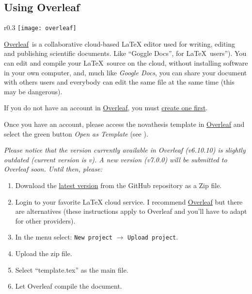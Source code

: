 \subsection{Using Overleaf}
\label{sub:using_overleaf}


\newcommand{\Overleaf}{\href{https://www.overleaf.com?r=f5160636&rm=d&rs=b}{Overleaf}}

\begin{wrapfigure}{r}{0.3\linewidth}
\texttt{[image: overleaf]}%
\caption{NOVAthesis template in Overleaf.}
\label{fig:overleaf}
\end{wrapfigure}
\mbox{}\Overleaf\ is a collaborative cloud-based LaTeX editor used for writing, editing and publishing scientific documents. Like “Goggle Docs”,  for \LaTeX\ users”). You can edit and compile your \LaTeX\ source on the cloud, without installing software in your own computer, and, much like \emph{Google Docs}, you can share your document with others users and everybody can edit the same file at the same time (this may be dangerous).

If you do not have an account in \Overleaf, you must \href{https://www.overleaf.com?r=f5160636&rm=d&rs=b}{create one first}.

Once you have an account, please access the \gls{novathesis} template in \href{https://www.overleaf.com/latex/templates/novathesis-v6-dot-10-dot-10/jhqwhtcwbmqc}{Overleaf} and select the green button \emph{Open as Template} (see ).

\bgroup
  \itshape
  Please notice that the version currently available in Overleaf (v6.10.10) is slightly outdated (current version is v\novathesisversion). A new version (v7.0.0) will be submitted to Overleaf soon.  Until then, please:
  \begin{enumerate}
    \item Download the \href{https://github.com/joaomlourenco/novathesis/archive/main.zip}{latest version} from the GitHub repository as a Zip file.
    \item Login to your favorite LaTeX cloud service. I recommend \href{https://www.overleaf.com/?r=f5160636&rm=d&rs=b}{Overleaf} but there are alternatives (these instructions apply to Overleaf and you'll have to adapt for other providers).
    \item In the menu select: \texttt{New project} $\rightarrow$ \texttt{Upload project}.
    \item Upload the zip file.
    \item Select “template.tex” as the main file.
    \item Let Overleaf compile the document.
  \end{enumerate}
\egroup

